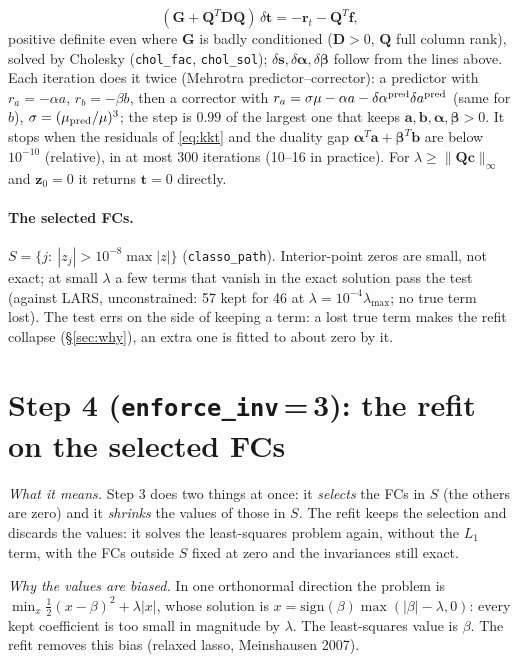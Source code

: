 \documentclass[11pt,a4paper]{article}
\newcommand{\bD}{\mathbf D}
\newcommand{\bG}{\mathbf G}
\newcommand{\bQ}{\mathbf Q}
\newcommand{\bc}{\mathbf c}
\newcommand{\bs}{\mathbf s}
\newcommand{\bt}{\mathbf t}
\newcommand{\bz}{\mathbf z}
\newcommand{\code}[1]{\texttt{#1}}
\begin{document}
\begin{equation}
(\bG+\bQ^T\bD\bQ)\,\delta\bt=-\mathbf r_t-\bQ^T\mathbf f ,
\end{equation}
positive definite even where $\bG$ is badly conditioned ($\bD>0$, $\bQ$ full column rank), solved by Cholesky
(\code{chol\_fac}, \code{chol\_sol}); $\delta\bs,\delta\boldsymbol\alpha,\delta\boldsymbol\beta$ follow from the lines above.
Each iteration does it twice (Mehrotra predictor--corrector): a predictor with $r_a=-\alpha a$, $r_b=-\beta b$, then a
corrector with $r_a=\sigma\mu-\alpha a-\delta\alpha^{\rm pred}\delta a^{\rm pred}$ (same for $b$), $\sigma=(\mu_{\rm pred}/\mu)^3$;
the step is $0.99$ of the largest one that keeps $\mathbf a,\mathbf b,\boldsymbol\alpha,\boldsymbol\beta>0$. It stops when the residuals of
\eqref{eq:kkt} and the duality gap $\boldsymbol\alpha^T\mathbf a+\boldsymbol\beta^T\mathbf b$ are below $10^{-10}$ (relative), in at most 300
iterations (10--16 in practice). For $\lambda\ge\|\bQ\bc\|_\infty$ and $\bz_0=0$ it returns $\bt=0$ directly.

\paragraph{The selected FCs.} $S=\{j:\ |z_j|>10^{-8}\max|z|\}$ (\code{classo\_path}). Interior-point zeros are small, not exact; at small
$\lambda$ a few terms that vanish in the exact solution pass the test (against LARS, unconstrained: 57 kept for 46 at
$\lambda=10^{-4}\lambda_{\max}$; no true term lost). The test errs on the side of keeping a term: a lost true term makes the
refit collapse (\S\ref{sec:why}), an extra one is fitted to about zero by it.

\section{\texorpdfstring{Step 4 (\code{enforce\_inv}\,=\,3): the refit on the selected FCs}{Step 4 (enforce\_inv = 3): the refit on the selected FCs}}\label{sec:refit}
\emph{What it means.} Step 3 does two things at once: it \emph{selects} the FCs in $S$ (the others are zero) and it
\emph{shrinks} the values of those in $S$. The refit keeps the selection and discards the values: it solves the
least-squares problem again, without the $L_1$ term, with the FCs outside $S$ fixed at zero and the invariances still exact.

\emph{Why the values are biased.} In one orthonormal direction the problem is $\min_x\tfrac12(x-\beta)^2+\lambda|x|$, whose
solution is $x=\mathrm{sign}(\beta)\max(|\beta|-\lambda,0)$: every kept coefficient is too small in magnitude by $\lambda$.
The least-squares value is $\beta$. The refit removes this bias (relaxed lasso, Meinshausen 2007).
\end{document}
